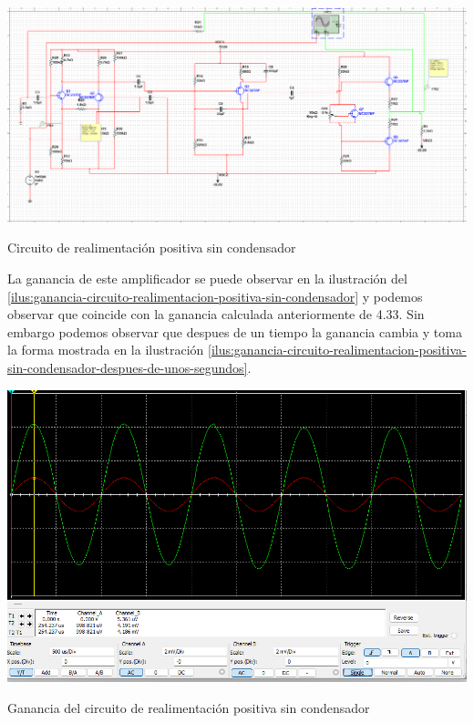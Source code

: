 \documentclass{article}
\begin{document}
\begin{ilustracion}[ht]
    \centering
    \includegraphics[width=\textwidth]{src/images/Prelaboratorio 5 - Realimentacion positiva sin condensador - circuito.png}
    \caption{Circuito de realimentación positiva sin condensador}
    \label{ilus:circuito-realimentacion-positiva-sin-condensador}
\end{ilustracion}

La ganancia de este amplificador se puede observar en la ilustración del \ref{ilus:ganancia-circuito-realimentacion-positiva-sin-condensador} y podemos observar que coincide con la ganancia calculada anteriormente de 4.33. Sin embargo podemos observar que despues de un tiempo la ganancia cambia y toma la forma mostrada en la ilustración \ref{ilus:ganancia-circuito-realimentacion-positiva-sin-condensador-despues-de-unos-segundos}.

\begin{ilustracion}[ht]
    \centering
    \includegraphics[width=\textwidth]{src/images/Prelaboratorio 5 - Realimentacion positiva sin condensador - ganancia.png}
    \caption{Ganancia del circuito de realimentación positiva sin condensador}
    \label{ilus:ganancia-circuito-realimentacion-positiva-sin-condensador}
\end{ilustracion}
\end{document}
